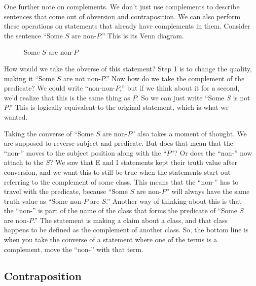 One further note on complements. We don't just use complements to describe sentences that come out of obversion and contraposition. We can also perform these operations on statements that already have complements in them. Consider the sentence ``Some $S$ are non-$P$.'' This is its Venn diagram. 

\begin{figure}[H]
\begin{center}
\captionsetup{singlelinecheck=on}
\caption*{Some $S$ are non-$P$}
\end{center} 
\end{figure}

How would we take the obverse of this statement? Step 1 is to change the quality, making it ``Some $S$ are not non-$P$.'' Now how do we take the complement of the predicate? We could write ``non-non-$P$,'' but if we think about it for a second, we'd realize that this is the same thing as $P$. So we can just write ``Some $S$ is not $P$.'' This is logically equivalent to the original statement, which is what we wanted.   

Taking the converse of ``Some $S$ are non-$P$'' also takes a moment of thought. We are supposed to reverse subject and predicate. But does that mean that the ``non-'' moves to the subject position along with the ``$P$''? Or does the ``non-'' now attach to the $S$? We saw that E and I statements kept their truth value after conversion, and we want this to still be true when the statements start out referring to the complement of some class. This means that the ``non-'' has to travel with the predicate, because ``Some $S$ are non-$P$'' will always have the same truth value as ``Some non-$P$ are $S$.'' Another way of thinking about this is that the ``non-'' is part of the name of the class that forms the predicate of ``Some $S$ are non-$P$.'' The statement is making a claim about a class, and that class happens to be defined as the complement of another class. So, the bottom line is when you take the converse of a statement where one of the terms is a complement, move the ``non-'' with that term. 

\subsection{Contraposition}

